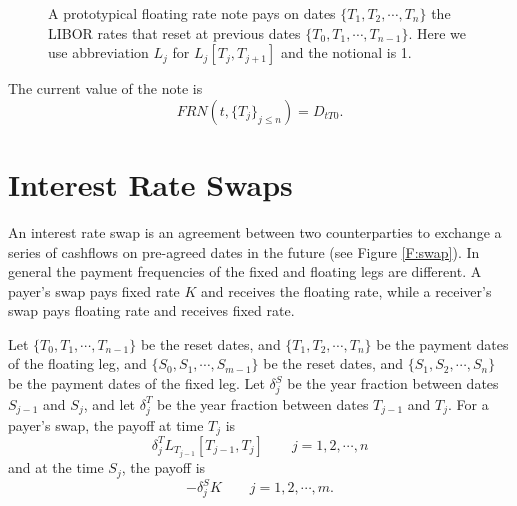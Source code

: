 \begin{figure}
  \caption{A prototypical floating rate note pays on dates 
           $\{T_1,T_2,\cdots,T_{n}\}$ the LIBOR rates that reset at previous 
           dates $\{T_0,T_1,\cdots,T_{n-1}\}$. Here we use
           abbreviation $L_j$ for $L_j[T_j,T_{j+1}]$ and the notional is 1. }
\end{figure}

The current value of the note is
\begin{equation}
  FRN(t,\{T_j\}_{j\le n}) = D_{tT0}.
\end{equation}


\section{Interest Rate Swaps}
An interest rate swap is an agreement between two counterparties
to exchange a series of cashflows on pre-agreed dates in the future (see Figure
\ref{F:swap}). In general the payment frequencies of the fixed and floating legs
are different. A payer's swap pays fixed rate $K$ and receives the floating rate, 
while a receiver's swap pays floating rate and receives fixed rate.

Let $\{T_0,T_1,\cdots,T_{n-1}\}$ be the reset dates, and
$\{T_1,T_2,\cdots,T_{n}\}$ be the payment dates of the floating leg, and
$\{S_0,S_1,\cdots,S_{m-1}\}$ be the reset dates, and
$\{S_1,S_2,\cdots,S_{n}\}$ be the payment dates of the fixed leg. 
Let $\delta^S_j$ be the year fraction between dates $S_{j-1}$ and $S_{j}$,
and let $\delta^T_{j}$ be the year fraction between dates $T_{j-1}$ and 
$T_{j}$. For a payer's swap, the payoff at time $T_j$ is
\[
  \delta^T_j L_{T_{j-1}}[T_{j-1},T_j]  \qquad j=1,2,\cdots,n
\]
and at the time $S_j$, the payoff is
\[
  - \delta^S_j K  \qquad j=1,2,\cdots,m.
\]

